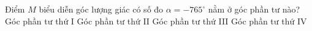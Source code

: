\begin{ex}%
	Điểm $M$ biểu diễn góc lượng giác có số đo $\alpha=-765^{\circ}$ nằm ở góc phần tư nào?
	\choice
	{Góc phần tư thứ I}
	{Góc phần tư thứ II}
	{Góc phần tư thứ III}
	{\True Góc phần tư thứ IV}


\end{ex}
